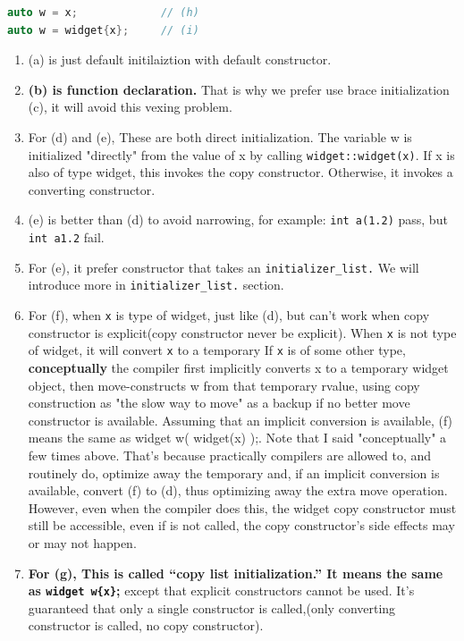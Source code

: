 \documentclass[a4paper,11pt,twoside]{book}
\begin{document}
\begin{itemize}
\begin{lstlisting}[frame=single, language=c++,mathescape=true]
auto w = x;             // (h)
auto w = widget{x};     // (i)
\end{lstlisting}
	
	\begin{enumerate}
		\item (a) is just default initilaiztion with default constructor.
		
		\item \textbf{(b) is function declaration.} That is why we prefer use brace initialization (c), it will avoid this vexing problem.
		
		\item For (d) and (e), These are both direct initialization. The variable w is initialized "directly" from the value of x by calling \texttt{widget::widget(x)}. If x is also of type widget, this invokes the copy constructor. Otherwise, it invokes a converting constructor.
		
		\item (e) is better than (d) to avoid narrowing, for example: \texttt{int a(1.2)} pass, but \texttt{int a{1.2}} fail.
		
		\item For (e), it prefer constructor that takes an \texttt{initializer\_list.} We will introduce more in \texttt{initializer\_list.} section.
		
		\item For (f), when \texttt{x} is type of widget, just like (d), but can't work when copy constructor is explicit(copy constructor never be explicit). When \texttt{x} is not type of widget, it will convert \texttt{x} to a temporary If \texttt{x} is of some other type, \textbf{conceptually} the compiler first implicitly converts x to a temporary widget object, then move-constructs w from that temporary rvalue, using copy construction as "the slow way to move" as a backup if no better move constructor is available. Assuming that an implicit conversion is available, (f) means the same as widget w( widget(x) );. Note that I said "conceptually" a few times above. That's because practically compilers are allowed to, and routinely do, optimize away the temporary and, if an implicit conversion is available, convert (f) to (d), thus optimizing away the extra move operation. However, even when the compiler does this, the widget copy constructor must still be accessible, even if is not called, the copy constructor's side effects may or may not happen.

		\item \textbf{For (g), This is called “copy list initialization.” It means the same as \texttt{widget w\{x\}};} except that explicit constructors cannot be used. It’s guaranteed that only a single constructor is called,(only converting constructor is called, no copy constructor).
		

\end{enumerate}
\end{itemize}
\end{document}
